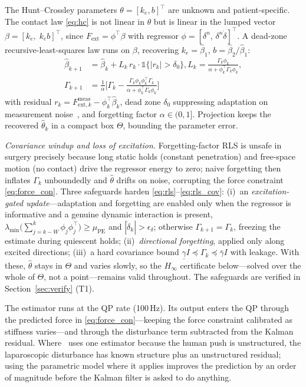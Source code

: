 The Hunt--Crossley parameters $\theta = [k_e, b]^\top$ are unknown and patient-specific. The contact law \eqref{eq:hc} is not linear in $\theta$ but is linear in the lumped vector $\beta = [k_e,\; k_e b]^\top$, since $F_{\text{ext}} = \phi^\top\beta$ with regressor $\phi = [\delta^n,\, \delta^n\dot\delta]^\top$. A dead-zone recursive-least-squares law runs on $\beta$, recovering $k_e=\hat\beta_1$, $b=\hat\beta_2/\hat\beta_1$:
\begin{align}
\hat{\beta}_{k+1} &= \hat{\beta}_k + L_k\, r_k \cdot \mathbb{1}\{|r_k| > \delta_0\}, L_k = \frac{\Gamma_k \phi_k}{\alpha + \phi_k^\top \Gamma_k \phi_k}, \label{eq:rls}\\
\Gamma_{k+1} &= \frac{1}{\alpha}\Big[ \Gamma_k - \frac{\Gamma_k \phi_k \phi_k^\top \Gamma_k}{\alpha + \phi_k^\top \Gamma_k \phi_k} \Big]
\label{eq:rls_cov}
\end{align}
with residual $r_k = F_{\text{ext},k}^{\text{meas}} - \phi_k^\top \hat{\beta}_k$, dead zone $\delta_0$ suppressing adaptation on measurement noise~\cite{iordanou1991}, and forgetting factor $\alpha \in (0,1]$. Projection keeps the recovered $\hat\theta_k$ in a compact box $\Theta$, bounding the parameter error.

\emph{Covariance windup and loss of excitation.} Forgetting-factor RLS is unsafe in surgery precisely because long static holds (constant penetration) and free-space motion (no contact) drive the regressor energy to zero; naive forgetting then inflates $\Gamma_k$ unboundedly and $\hat{\theta}$ drifts on noise, corrupting the force constraint \eqref{eq:force_con}. Three safeguards harden \eqref{eq:rls}--\eqref{eq:rls_cov}: (i)~an \emph{excitation-gated update}---adaptation and forgetting are enabled only when the regressor is informative and a genuine dynamic interaction is present, $\lambda_{\min}\big(\sum_{j=k-W}^{k}\phi_j\phi_j^\top\big) \ge \mu_{\text{PE}}$ and $|\dot\delta_k| > \epsilon_\delta$; otherwise $\Gamma_{k+1}=\Gamma_k$, freezing the estimate during quiescent holds; (ii)~\emph{directional forgetting}, applied only along excited directions; (iii)~a hard covariance bound $\underline{\gamma} I \preceq \Gamma_k \preceq \bar{\gamma} I$ with leakage. With these, $\hat\theta$ stays in $\Theta$ and varies slowly, so the $H_\infty$ certificate below---solved over the whole of $\Theta$, not a point---remains valid throughout. The safeguards are verified in Section~\ref{sec:verify} (T1).

The estimator runs at the QP rate (100\,Hz). Its output enters the QP through the predicted force in \eqref{eq:force_con}---keeping the force constraint calibrated as stiffness varies---and through the disturbance term subtracted from the Kalman residual. Where~\cite{cao2026phri} uses one estimator because the human push is unstructured, the laparoscopic disturbance has known structure plus an unstructured residual; using the parametric model where it applies improves the prediction by an order of magnitude before the Kalman filter is asked to do anything.

